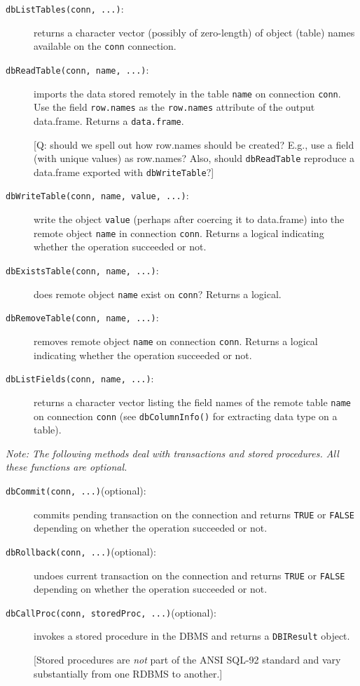 \documentclass[graphics,times,psfig,dvips,hyper]{article}
\newcommand{\sobj}[1]{\mbox{\tt #1}}    %
\newcommand{\sexp}[1]{\mbox{\tt #1}}    %
\newcommand{\sclass}[1]{\mbox{\tt #1}}  %
\newcommand{\smethod}[1]{\mbox{\tt #1}} %
\begin{document}
\begin{description}
\item[\smethod{dbListTables(conn, ...)}:]
  returns a character vector (possibly of zero-length) of object (table) 
  names available on the \sobj{conn} connection.

\item[\smethod{dbReadTable(conn, name, ...)}:]
  imports the data stored remotely in the table \sobj{name}
  on connection \sobj{conn}. Use the field \sobj{row.names} 
  as the \sexp{row.names} attribute of the output data.frame.
  Returns a \sclass{data.frame}.

  [Q: should we spell out how row.names should be created? E.g.,
  use a field (with unique values) as row.names?  Also, should
  \smethod{dbReadTable} reproduce a data.frame exported with
  \smethod{dbWriteTable}?]

\item[\smethod{dbWriteTable(conn, name, value, ...)}:]
  write the object \sobj{value} (perhaps after coercing it to 
  data.frame) into the remote object \sobj{name} in connection
  \sobj{conn}.  Returns a logical indicating whether the operation
  succeeded or not.

\item[\smethod{dbExistsTable(conn, name, ...)}:]
  does remote object \sobj{name} exist on \sobj{conn}?
  Returns a logical.

\item[\smethod{dbRemoveTable(conn, name, ...)}:]
  removes remote object \sobj{name} on connection \sobj{conn}.
  Returns a logical indicating whether the operation succeeded or not.

\item[\smethod{dbListFields(conn, name, ...)}:] returns a character vector
listing the field names of the remote table \sobj{name} on connection
\sobj{conn} (see \smethod{dbColumnInfo()} for extracting data type 
on a table).

\end{description}

\emph{Note: The following methods deal with transactions and 
   stored procedures. All these functions are optional.
}
\begin{description}
\item[\smethod{dbCommit(conn, ...)}(optional):]
  commits pending transaction on the connection and returns 
  \sobj{TRUE} or \sobj{FALSE} depending on whether the operation
  succeeded or not.

\item[\smethod{dbRollback(conn, ...)}(optional):]
  undoes current transaction on the connection and returns
  \sobj{TRUE} or \sobj{FALSE} depending on whether the operation
  succeeded or not.

\item[\smethod{dbCallProc(conn, storedProc, ...)}(optional):]
  invokes a stored procedure in the DBMS and returns a \sclass{DBIResult} 
  object.

  [Stored procedures are \emph{not} part of the ANSI SQL-92 standard and
  vary substantially from one RDBMS to another.]

\end{description}
\end{document}
